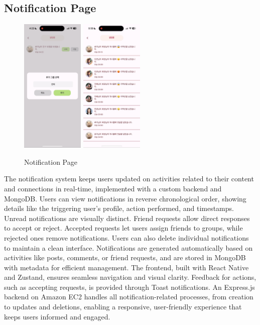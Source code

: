        \subsection{Notification Page}
        \begin{figure}[htbp]
            \centerline{
            \includegraphics[width=3cm]{Images/page/notification1.png}
            \includegraphics[width=3cm]{Images/page/notification2.png}}
              \caption{Notification Page}
            \label{fig}
        \end{figure}
        The notification system keeps users updated on activities related to their content and connections in real-time, implemented with a custom backend and MongoDB. Users can view notifications in reverse chronological order, showing details like the triggering user's profile, action performed, and timestamps. Unread notifications are visually distinct.
        Friend requests allow direct responses to accept or reject. Accepted requests let users assign friends to groups, while rejected ones remove notifications. Users can also delete individual notifications to maintain a clean interface. Notifications are generated automatically based on activities like posts, comments, or friend requests, and are stored in MongoDB with metadata for efficient management. 
        The frontend, built with React Native and Zustand, ensures seamless navigation and visual clarity. Feedback for actions, such as accepting requests, is provided through Toast notifications. An Express.js backend on Amazon EC2 handles all notification-related processes, from creation to updates and deletions, enabling a responsive, user-friendly experience that keeps users informed and engaged.

